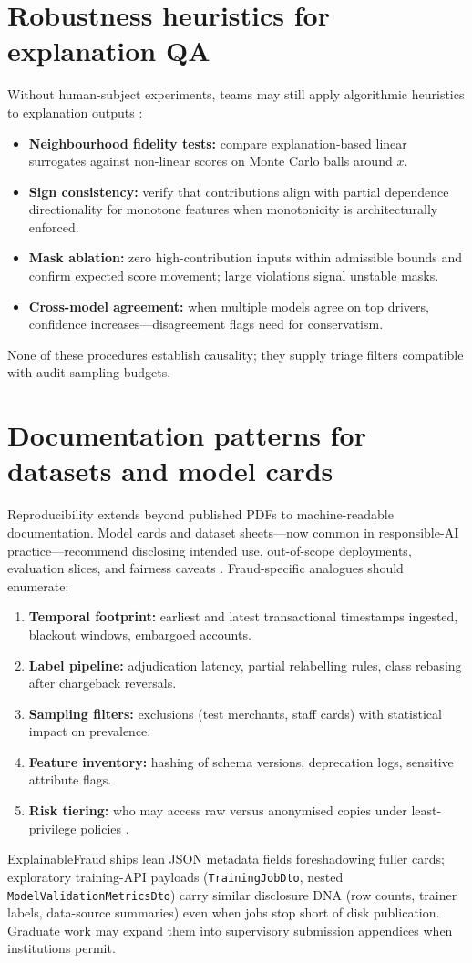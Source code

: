 \chapter{Robustness heuristics for explanation QA}
Without human-subject experiments, teams may still apply algorithmic heuristics to explanation outputs \cite{xai_survey}:
\begin{itemize}
    \item \textbf{Neighbourhood fidelity tests:} compare explanation-based linear surrogates against non-linear scores on Monte Carlo balls around $x$.
    \item \textbf{Sign consistency:} verify that contributions align with partial dependence directionality for monotone features when monotonicity is architecturally enforced.
    \item \textbf{Mask ablation:} zero high-contribution inputs within admissible bounds and confirm expected score movement; large violations signal unstable masks.
    \item \textbf{Cross-model agreement:} when multiple models agree on top drivers, confidence increases—disagreement flags need for conservatism.
\end{itemize}
None of these procedures establish causality; they supply triage filters compatible with audit sampling budgets.

\chapter{Documentation patterns for datasets and model cards}
Reproducibility extends beyond published PDFs to machine-readable documentation. Model cards and dataset sheets—now common in responsible-AI practice—recommend disclosing intended use, out-of-scope deployments, evaluation slices, and fairness caveats \cite{xai_survey}. Fraud-specific analogues should enumerate:
\begin{enumerate}
    \item \textbf{Temporal footprint:} earliest and latest transactional timestamps ingested, blackout windows, embargoed accounts.
    \item \textbf{Label pipeline:} adjudication latency, partial relabelling rules, class rebasing after chargeback reversals.
    \item \textbf{Sampling filters:} exclusions (test merchants, staff cards) with statistical impact on prevalence.
    \item \textbf{Feature inventory:} hashing of schema versions, deprecation logs, sensitive attribute flags.
    \item \textbf{Risk tiering:} who may access raw versus anonymised copies under least-privilege policies \cite{gdpr_text,fraud_handbook}.
\end{enumerate}
ExplainableFraud ships lean JSON metadata fields foreshadowing fuller cards; exploratory training-API payloads (\texttt{Training\allowbreak Job\allowbreak Dto}, nested \texttt{Model\allowbreak Validation\allowbreak Metrics\allowbreak Dto}) carry similar disclosure DNA (row counts, trainer labels, data-source summaries) even when jobs stop short of disk publication. Graduate work may expand them into supervisory submission appendices when institutions permit.

